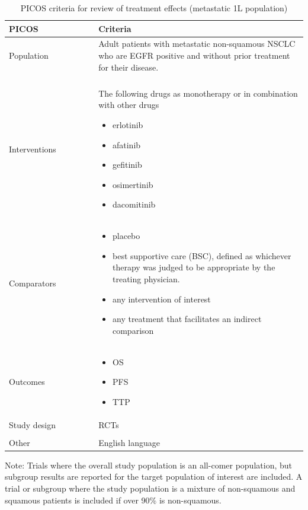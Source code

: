 \documentclass[11pt,final,fleqn]{article}\usepackage[]{graphicx}\usepackage[]{color}
\theoremstyle{plain}
\begin{document}
\begin{appendices}
\begin{table}[!ht]
\begin{center}
\begin{threeparttable}
\caption{PICOS criteria for review of treatment effects (metastatic 1L population)} \label{tbl:picos-tx-effects-1L}
\begin{tabular}{p{0.3\linewidth}p{0.7\linewidth}}
\hline
\multicolumn{1}{l}{PICOS} &  \multicolumn{1}{l}{Criteria}\\
\hline
Population & Adult patients with metastatic non-squamous NSCLC who are EGFR positive and without prior treatment for their disease.\\
&\\
Interventions & The following drugs as monotherapy or in combination with other drugs 
\begin{itemize}
\item erlotinib
\item afatinib
\item gefitinib
\item osimertinib
\item dacomitinib
\end{itemize} \\
Comparators & 
\begin{itemize}
\item placebo
\item best supportive care (BSC), defined as whichever therapy was judged to be appropriate by the treating physician.
\item any intervention of interest
\item any treatment that facilitates an indirect comparison
\end{itemize} \\
Outcomes & 
\begin{itemize}
\item OS
\item PFS
\item TTP
\end{itemize} \\
Study design & RCTs \\
&\\
Other & English language\\
\hline
\end{tabular}
\scriptsize Note: Trials where the overall study population is an all-comer population, but subgroup results are reported for the target population of interest are included. A trial or subgroup where the study population is a mixture of non-squamous and squamous patients is included if over 90\% is non-squamous. 
\end{threeparttable}
\end{center}
\end{table}



\end{appendices}
\end{document}
